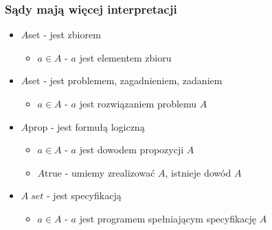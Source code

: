 \documentclass{beamer}
\begin{document}
\begin{frame}
\frametitle{Sądy mają więcej interpretacji}

\begin{itemize}
 \item $A$\;set -  jest zbiorem
\begin{itemize}
 \item $a \in A$ - $a$ jest elementem zbioru
\end{itemize}
 \item $A$\;set -  jest problemem, zagadnieniem, zadaniem
\begin{itemize}
 \item $a \in A$ - $a$ jest rozwiązaniem problemu $A$
\end{itemize}
 \item $A$\;prop - jest formułą logiczną
\begin{itemize}
 \item $a \in A$ - $a$ jest dowodem propozycji $A$
 \item $A$\;true - umiemy zrealizować $A$, istnieje dowód $A$
\end{itemize}
 \item $A\;set$  - jest specyfikacją 
\begin{itemize}
 \item $a \in A$ - $a$ jest programem spełniającym specyfikację $A$
\end{itemize}
\end{itemize}

\end{frame}

\end{document}
